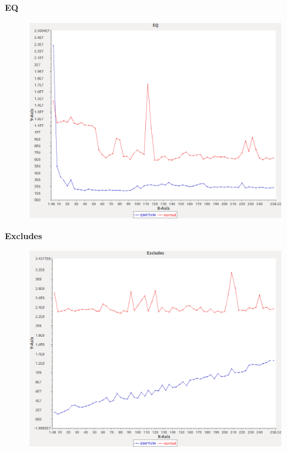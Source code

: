 \noindent\textbf{EQ}

\begin{figure}[h]
\centering
\includegraphics[width=\textwidth]{../graphs/bag/EQ}
\end{figure}
\pagebreak

\noindent\textbf{Excludes}

\begin{figure}[h]
\centering
\includegraphics[width=\textwidth]{../graphs/bag/Excludes}
\end{figure}
\pagebreak


